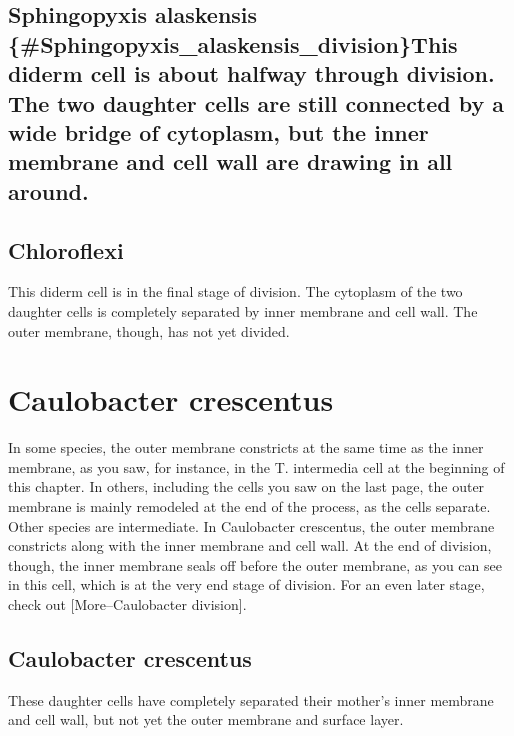 \documentclass[]{tufte-book}
\begin{document}
\subsection{Sphingopyxis alaskensis
\{\#Sphingopyxis\_alaskensis\_division\}This diderm cell is about
halfway through division. The two daughter cells are still connected by
a wide bridge of cytoplasm, but the inner membrane and cell wall are
drawing in all
around.}\label{sphingopyxis-alaskensis-sphingopyxis_alaskensis_divisionthis-diderm-cell-is-about-halfway-through-division.-the-two-daughter-cells-are-still-connected-by-a-wide-bridge-of-cytoplasm-but-the-inner-membrane-and-cell-wall-are-drawing-in-all-around.}

\subsection{Chloroflexi}\label{Chloroflexi_division}

This diderm cell is in the final stage of division. The cytoplasm of the
two daughter cells is completely separated by inner membrane and cell
wall. The outer membrane, though, has not yet divided.

\section{Caulobacter crescentus}\label{caulobacter-crescentus-4}

In some species, the outer membrane constricts at the same time as the
inner membrane, as you saw, for instance, in the T. intermedia cell at
the beginning of this chapter. In others, including the cells you saw on
the last page, the outer membrane is mainly remodeled at the end of the
process, as the cells separate. Other species are intermediate. In
Caulobacter crescentus, the outer membrane constricts along with the
inner membrane and cell wall. At the end of division, though, the inner
membrane seals off before the outer membrane, as you can see in this
cell, which is at the very end stage of division. For an even later
stage, check out {[}More--Caulobacter division{]}.

\subsection{Caulobacter crescentus}\label{Caulobacter_division}

These daughter cells have completely separated their mother's inner
membrane and cell wall, but not yet the outer membrane and surface
layer.
\end{document}
